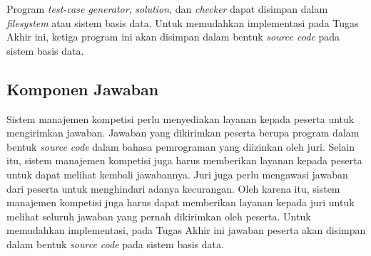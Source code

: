 \par Program \textit{test-case generator}, \textit{solution}, dan \textit{checker} dapat disimpan dalam \textit{filesystem} atau sistem basis data. Untuk memudahkan implementasi pada Tugas Akhir ini, ketiga program ini akan disimpan dalam bentuk \textit{source code} pada sistem basis data.

\subsection{Komponen Jawaban}

\par Sistem manajemen kompetisi perlu menyediakan layanan kepada peserta untuk mengirimkan jawaban. Jawaban yang dikirimkan peserta berupa program dalam bentuk \textit{source code} dalam bahasa pemrograman yang diizinkan oleh juri. Selain itu, sistem manajemen kompetisi juga harus memberikan layanan kepada peserta untuk dapat melihat kembali jawabannya. Juri juga perlu mengawasi jawaban dari peserta untuk menghindari adanya kecurangan.  Oleh karena itu, sistem manajemen kompetisi juga harus dapat memberikan layanan kepada juri untuk melihat seluruh jawaban yang pernah dikirimkan oleh peserta. Untuk memudahkan implementasi, pada Tugas Akhir ini jawaban peserta akan disimpan dalam bentuk \textit{source code} pada sistem basis data.

